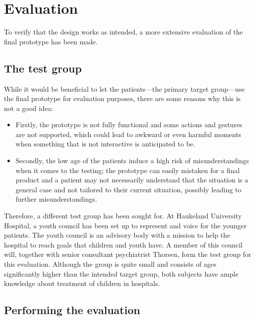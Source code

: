 \chapter{Evaluation}
\label{ch:evaluation}

To verify that the design works as intended, a more extensive evaluation of the final prototype has been made.

\section{The test group}
\label{sec:testgroup}

While it would be beneficial to let the patients---the primary target group---use the final prototype for evaluation purposes, there are some reasons why this is not a good idea:

\begin{itemize}
    \item Firstly, the prototype is not fully functional and some actions and gestures are not supported, which could lead to awkward or even harmful moments when something that is not interactive is anticipated to be.
    \item Secondly, the low age of the patients induce a high risk of misunderstandings when it comes to the testing; the prototype can easily mistaken for a final product and a patient may not necessarily understand that the situation is a general case and not tailored to their current situation, possibly leading to further misunderstandings.
\end{itemize}

Therefore, a different test group has been sought for. At Haukeland University Hospital, a youth council has been set up to represent and voice for the younger patients. The youth council is an advisory body with a mission to help the hospital to reach goals that children and youth have. A member of this council will, together with senior consultant psychiatrist Thorsen, form the test group for this evaluation. Although the group is quite small and consists of ages significantly higher than the intended target group, both subjects have ample knowledge about treatment of children in hospitals.


\section{Performing the evaluation}

